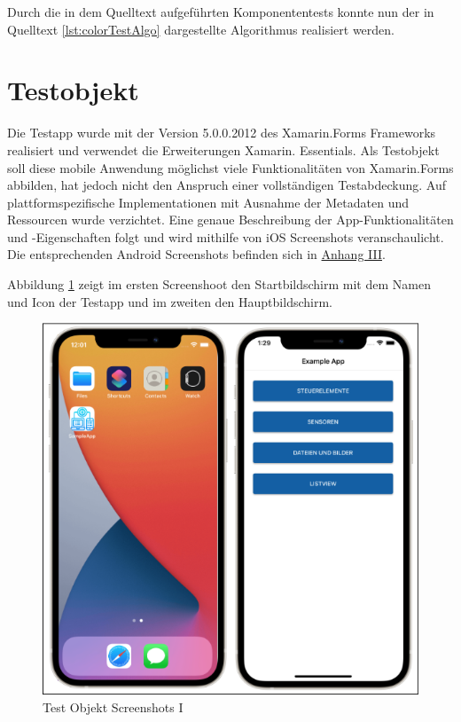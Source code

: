 Durch die in dem Quelltext aufgeführten Komponententests konnte nun der in Quelltext \ref{lst:colorTestAlgo} dargestellte Algorithmus realisiert werden. 
\newpage




\section{Testobjekt}
Die Testapp wurde mit der Version 5.0.0.2012 des Xamarin.Forms Frameworks realisiert und verwendet die Erweiterungen Xamarin. Essentials.  Als Testobjekt soll diese mobile Anwendung möglichst viele Funktionalitäten von Xamarin.Forms abbilden,  hat jedoch nicht den Anspruch einer vollständigen Testabdeckung.
Auf plattformspezifische Implementationen mit Ausnahme der Metadaten und Ressourcen wurde verzichtet.  Eine genaue Beschreibung der App-Funktionalitäten und -Eigenschaften folgt und wird mithilfe von iOS Screenshots veranschaulicht.  Die entsprechenden Android Screenshots befinden sich in \hyperref[chap:AnhangAndroidScreenshots]{Anhang III}.  

Abbildung \ref{fig:TestObjectI} zeigt im ersten Screenshoot den Startbildschirm mit dem Namen und Icon der Testapp und im zweiten den Hauptbildschirm.  


\begin{figure}[!ht]
 \includegraphics[width=\textwidth,keepaspectratio]{Images/Screenshot/AppIconAndMenu.png}
 \caption{Test Objekt Screenshots I}
 \label{fig:TestObjectI}
\end{figure}


